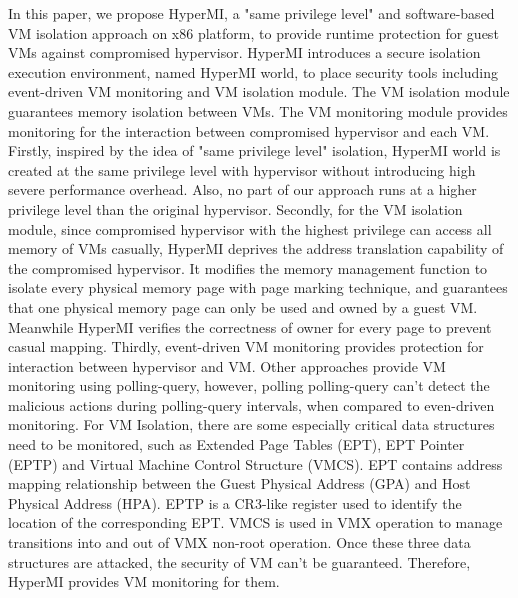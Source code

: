 \documentclass[conference]{IEEEtran}
\begin{document}
In this paper, we propose HyperMI, a "same privilege level" and software-based VM isolation approach on x86 platform, to provide runtime protection for guest VMs against compromised hypervisor. HyperMI introduces a secure isolation execution environment, named HyperMI world, to place security tools including event-driven VM monitoring and VM isolation module. The VM isolation module guarantees memory isolation between VMs. The VM monitoring module provides monitoring for the interaction between compromised hypervisor and each VM. 
Firstly, inspired by the idea of "same privilege level" isolation, HyperMI world is created at the same privilege level with hypervisor without introducing high severe performance overhead. Also, no part of our approach runs at a higher privilege level than the original hypervisor. 
Secondly, for the VM isolation module, since compromised hypervisor with the highest privilege can access all memory of VMs casually, 
HyperMI deprives the address translation capability of the compromised hypervisor. 
It modifies the memory management function to isolate every physical memory page with page marking technique, and guarantees that one physical memory page can only be used and owned by a guest VM. Meanwhile
HyperMI verifies the correctness of owner for every page to prevent casual mapping.
Thirdly, event-driven VM monitoring provides protection for interaction between hypervisor and VM.
Other approaches provide VM monitoring using polling-query, however, polling polling-query can't detect the malicious actions during polling-query intervals,
when compared to even-driven monitoring. For VM Isolation, there are some especially critical data structures need to be monitored, such as Extended Page Tables (EPT), EPT Pointer (EPTP) and Virtual Machine Control Structure (VMCS). EPT contains address mapping relationship between the Guest Physical Address (GPA) and Host Physical Address (HPA). EPTP is a CR3-like register used to identify the location of the corresponding EPT. VMCS is used in VMX operation to manage transitions into and out of VMX non-root operation. 
Once these three data structures are attacked, the security of VM can't be guaranteed. Therefore, HyperMI provides VM monitoring for them.
\end{document}
